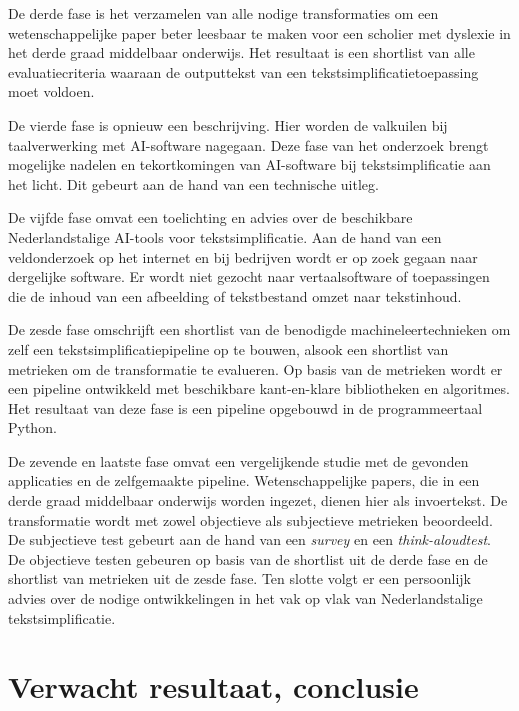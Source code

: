 De derde fase is het verzamelen van alle nodige transformaties om een wetenschappelijke paper beter leesbaar te maken voor een scholier met dyslexie in het derde graad middelbaar onderwijs. Het resultaat is een shortlist van alle evaluatiecriteria waaraan de outputtekst van een tekstsimplificatietoepassing moet voldoen.

De vierde fase is opnieuw een beschrijving. Hier worden de valkuilen bij taalverwerking met AI-software nagegaan. Deze fase van het onderzoek brengt mogelijke nadelen en tekortkomingen van AI-software bij tekstsimplificatie aan het licht. Dit gebeurt aan de hand van een technische uitleg.

De vijfde fase omvat een toelichting en advies over de beschikbare Nederlandstalige AI-tools voor tekstsimplificatie. Aan de hand van een veldonderzoek op het internet en bij bedrijven wordt er op zoek gegaan naar dergelijke software. Er wordt niet gezocht naar vertaalsoftware of toepassingen die de inhoud van een afbeelding of tekstbestand omzet naar tekstinhoud.

De zesde fase omschrijft een shortlist van de benodigde machineleertechnieken om zelf een tekstsimplificatiepipeline op te bouwen, alsook een shortlist van metrieken om de transformatie te evalueren. Op basis van de metrieken wordt er een pipeline ontwikkeld met beschikbare kant-en-klare bibliotheken en algoritmes. Het resultaat van deze fase is een pipeline opgebouwd in de programmeertaal Python. 

De zevende en laatste fase omvat een vergelijkende studie met de gevonden applicaties en de zelfgemaakte pipeline. Wetenschappelijke papers, die in een derde graad middelbaar onderwijs worden ingezet, dienen hier als invoertekst. De transformatie wordt met zowel objectieve als subjectieve metrieken beoordeeld. De subjectieve test gebeurt aan de hand van een \textit{survey} en een \textit{think-aloudtest}. De objectieve testen gebeuren op basis van de shortlist uit de derde fase en de shortlist van metrieken uit de zesde fase. Ten slotte volgt er een persoonlijk advies over de nodige ontwikkelingen in het vak op vlak van Nederlandstalige tekstsimplificatie.

\section{Verwacht resultaat, conclusie}
\label{sec:verwachte_resultaten}

